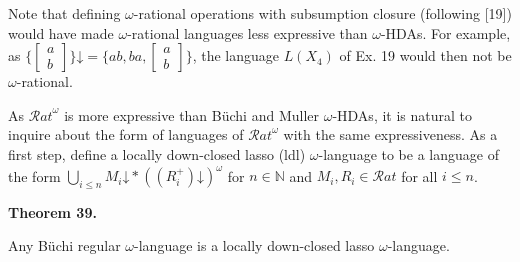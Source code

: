 Note that defining $\omega$-rational operations with subsumption closure (following [19]) would have made $\omega$-rational languages less expressive than $\omega$-HDAs. For example, as $\{\left[\begin{smallmatrix}a\\
b\end{smallmatrix}\right]\}\mathord{\downarrow}={\{ab,ba,\left[\begin{smallmatrix}a\\
b\end{smallmatrix}\right]\}}$, the language $L(X_{4})$ of Ex. 19 would then not be $\omega$-rational.\par
 
 
 
As ${\mathcal{R}at}^{\omega}$ is more expressive than Büchi and Muller $\omega$-HDAs, it is natural to inquire about the form of languages of ${\mathcal{R}at}^{\omega}$ with the same expressiveness. As a first step, define a locally down-closed lasso (ldl) $\omega$-language to be a language of the form $\bigcup\nolimits_{i\leqslant n}M_{i}\mathord{\downarrow}*((R_{i}^{+})\mathord{\downarrow})^{\omega}$ for $n\in\mathbb{N}$ and $M_{i},R_{i}\in\mathcal{R}at$ for all $i\leqslant n$.\par
 
 
 
\par\medskip\noindent\textbf{Theorem 39.}\par
 
 
Any Büchi regular $\omega$-language is a locally down-closed lasso $\omega$-language.\par
 
 
 
 
